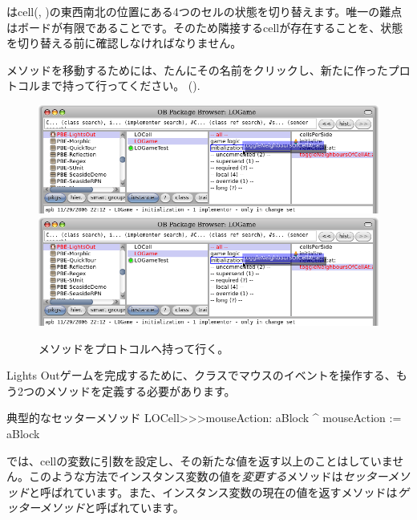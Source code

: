 \documentclass[a4paper,10pt,twoside]{book}
\begin{document}
 はcell(, )の東西南北の位置にある4つのセルの状態を切り替えます。唯一の難点はボードが有限であることです。そのため隣接するcellが存在することを、状態を切り替える前に確認しなければなりません。

メソッドを移動するためには、たんにその名前をクリックし、新たに作ったプロトコルまで持って行ってください。 ().

\begin{figure}[htbp]
   \centering
   \ifluluelse
		{\includegraphics[width=\textwidth]{DragMethod} }
		{\includegraphics[scale=0.7]{DragMethod} }
   \caption{メソッドをプロトコルへ持って行く。}
\end{figure}

Lights Outゲームを完成するために、クラスでマウスのイベントを操作する、もう2つのメソッドを定義する必要があります。
\begin{method}[mouseAction:]{典型的なセッターメソッド}
LOCell>>>mouseAction: aBlock
   ^ mouseAction := aBlock
\end{method}

 では、cellの変数に引数を設定し、その新たな値を返す以上のことはしていません。このような方法でインスタンス変数の値を\emph{変更する}メソッドは\emph{セッターメソッド}と呼ばれています。また、インスタンス変数の現在の値を返すメソッドは\emph{ゲッターメソッド}と呼ばれています。
\end{document}
